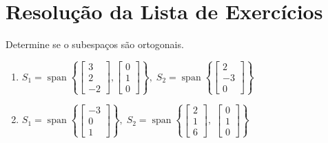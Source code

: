\chapter{Resolução da Lista de Exercícios}


\begin{question}
  Determine se o subespaços são ortogonais.
  \begin{enumerate}[label=\alph*)]
    \item $S_1 = \operatorname{span}\left\{\begin{bmatrix}
              3 \\ 2 \\ -2
            \end{bmatrix}, \begin{bmatrix}
              0 \\ 1 \\ 0
            \end{bmatrix}\right\}, \;
            S_2 = \operatorname{span}\left\{
            \begin{bmatrix}
              2 \\ -3 \\ 0
            \end{bmatrix}
            \right\}$

    \item $S_1 = \operatorname{span}\left\{\begin{bmatrix}
              -3 \\ 0 \\ 1
            \end{bmatrix}\right\}, \;
            S_2 = \operatorname{span}\left\{
            \begin{bmatrix}
              2 \\ 1 \\ 6
            \end{bmatrix}, \;
            \begin{bmatrix}
              0 \\ 1 \\ 0
            \end{bmatrix}
            \right\}$


\end{enumerate}
\end{question}
